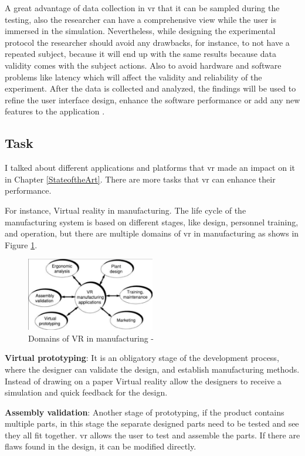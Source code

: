 A great advantage of data collection in \acrlong{vr} that it can be sampled during the testing, also the researcher can have a comprehensive view while the user is immersed in the simulation. Nevertheless, while designing the experimental protocol the researcher should avoid any drawbacks, for instance, to not have a repeated subject, because it will end up with the same results because data validity comes with the subject actions. Also to avoid hardware and software problems like latency which will affect the validity and reliability of the experiment. After the data is collected and analyzed, the findings will be used to refine the user interface design, enhance the software performance or add any new features to the application \citep{burdea2017virtual}. 
 
\subsection{Task}

I talked about different applications and platforms that \acrshort{vr} made an impact on it in Chapter \ref{StateoftheArt}. There are more tasks that \acrlong{vr} can enhance their performance.

For instance, Virtual reality in manufacturing. The life cycle of the manufacturing system is based on different stages, like design, personnel training, and operation, but there are multiple domains of \acrshort{vr} in manufacturing as shows in Figure \ref{fig:vrman}. 
\begin{figure}[ht]
    \centering
    \includegraphics[width=0.50\textwidth]{images/VRmanu.png}
    \caption{Domains of VR in manufacturing - \citep{burdea2017virtual}}
    \label{fig:vrman}
\end{figure}

\textbf{Virtual prototyping}: It is an obligatory stage of the development process, where the designer can validate the design, and establish manufacturing methods. Instead of drawing on a paper Virtual reality allow the designers to receive a simulation and quick feedback for the design.


\textbf{Assembly validation}: Another stage of prototyping, if the product contains multiple parts, in this stage the separate designed parts need to be tested and see they all fit together. \acrshort{vr} allows the user to test and assemble the parts. If there are flaws found in the design, it can be modified directly. 


